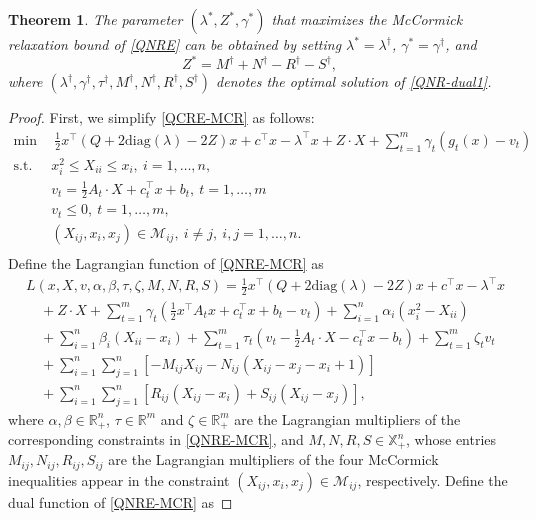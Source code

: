 \documentclass[pdflatex,sn-mathphys-num]{sn-jnl}%
\theoremstyle{thmstyleone}%
\newtheorem{theorem}{Theorem}%
\theoremstyle{thmstyletwo}%
\theoremstyle{thmstylethree}%
\begin{document}
\begin{theorem}\label{thm1}
	The parameter $(\lambda^\ast,Z^\ast,\gamma^\ast)$ that maximizes the McCormick relaxation bound of \eqref{QNRE} can be obtained by setting $\lambda^\ast=\lambda^\dag$, $\gamma^\ast=\gamma^\dag$, and
	\begin{equation}
		Z^\ast= M^\dag +  N^\dag -  R^\dag -  S^\dag,
	\end{equation}
	where $(\lambda^\dag,\gamma^\dag,\tau^\dag,M^\dag,N^\dag,R^\dag,S^\dag)$ denotes the optimal solution of \eqref{QNR-dual1}.
\end{theorem}
\begin{proof}
	First, we simplify \eqref{QCRE-MCR} as follows:
	\begin{equation}\label{QNRE-MCR}
		\begin{aligned}
			\min ~&~\frac{1}{2}x^\top(Q+2\textrm{diag}(\lambda)-2Z)x+c^\top x-\lambda^\top x+ Z\cdot X+\sum_{t=1}^m \gamma_t \left(g_t(x)-v_t\right)\\
			\textrm{s.t.}~ &x_i^2\leq X_{ii} \leq x_i,~i=1,\ldots,n,\\
			& v_t= \frac{1}{2}A_t \cdot X+ c_t^\top x+b_t,~t=1,\ldots,m\\
			&v_t\leq 0,~t=1,\ldots,m,\\
			&(X_{ij},x_i,x_j)\in \mathcal{M}_{ij}, ~i\neq j, ~i,j=1,\ldots,n.\\
		\end{aligned}
	\end{equation}	
	Define the Lagrangian function of \eqref{QNRE-MCR} as
	\begin{equation}
		\begin{aligned}
			&L(x,X,v,\alpha,\beta,\tau,\zeta,M,N,R,S)=\frac{1}{2}x^\top(Q+2\textrm{diag}(\lambda)-2Z)x+c^\top x-\lambda^\top x \\
			&\quad + Z\cdot X+\sum_{t=1}^m \gamma_t \left(\frac{1}{2} x^\top A_t x+c_t^\top x+b_t-v_t\right)+\sum_{i=1}^n\alpha_i(x_i^2-X_{ii})\\
			&\quad +\sum_{i=1}^n\beta_i(X_{ii}-x_i)+\sum_{t=1}^m \tau_t\left(  v_t-\frac{1}{2}A_t \cdot X- c_t^\top x-b_t \right)
			+\sum_{t=1}^m \zeta_t v_t\\
			&\quad +\sum_{i=1}^n\sum_{j=1}^n\left[ -M_{ij}X_{ij}-N_{ij}\left(X_{ij}-x_j-x_i+1\right)  \right]\\
			&\quad +\sum_{i=1}^n\sum_{j=1}^n\left[  R_{ij}(X_{ij}-x_i)+S_{ij}(X_{ij}-x_j) \right],
		\end{aligned}
	\end{equation}
	where $\alpha,\beta\in \mathbb{R}^n_+$, $\tau\in \mathbb{R}^m$ and $\zeta\in \mathbb{R}^m_+$ are the Lagrangian multipliers of the corresponding constraints in \eqref{QNRE-MCR}, and $M, N, R, S \in \mathbb{X}^n_+$, whose entries $M_{ij}, N_{ij}, R_{ij}, S_{ij}$ are the Lagrangian multipliers of the four McCormick inequalities appear in the constraint $\left(X_{ij},x_i,x_j\right)\in \mathcal{M}_{ij}$, respectively. Define the dual function of \eqref{QNRE-MCR} as

\end{proof}
\end{document}
